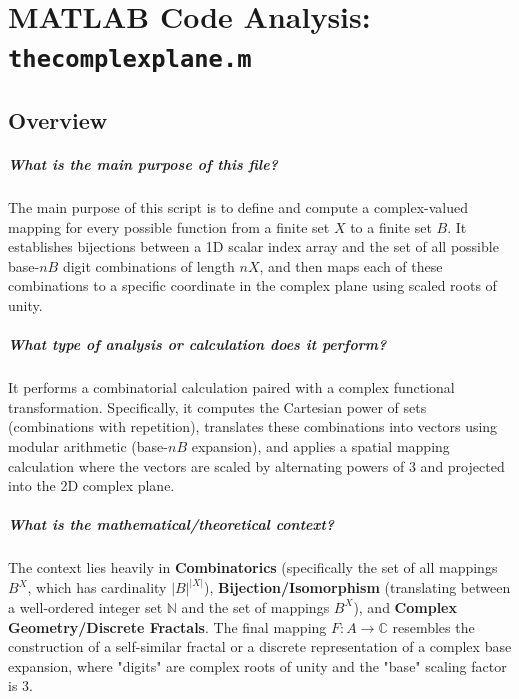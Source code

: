 
\chapter{MATLAB Code Analysis: \texttt{thecomplexplane.m}}
\date{}


\maketitle

\section{Overview}

\paragraph{What is the main purpose of this file?}
The main purpose of this script is to define and compute a complex-valued mapping for every possible function from a finite set $X$ to a finite set $B$. It establishes bijections between a 1D scalar index array and the set of all possible base-$nB$ digit combinations of length $nX$, and then maps each of these combinations to a specific coordinate in the complex plane using scaled roots of unity.

\paragraph{What type of analysis or calculation does it perform?}
It performs a combinatorial calculation paired with a complex functional transformation. Specifically, it computes the Cartesian power of sets (combinations with repetition), translates these combinations into vectors using modular arithmetic (base-$nB$ expansion), and applies a spatial mapping calculation where the vectors are scaled by alternating powers of 3 and projected into the 2D complex plane.

\paragraph{What is the mathematical/theoretical context?}
The context lies heavily in \textbf{Combinatorics} (specifically the set of all mappings $B^X$, which has cardinality $|B|^{|X|}$), \textbf{Bijection/Isomorphism} (translating between a well-ordered integer set $\mathbb{N}$ and the set of mappings $B^X$), and \textbf{Complex Geometry/Discrete Fractals}. The final mapping $F: A \to \mathbb{C}$ resembles the construction of a self-similar fractal or a discrete representation of a complex base expansion, where "digits" are complex roots of unity and the "base" scaling factor is 3.

